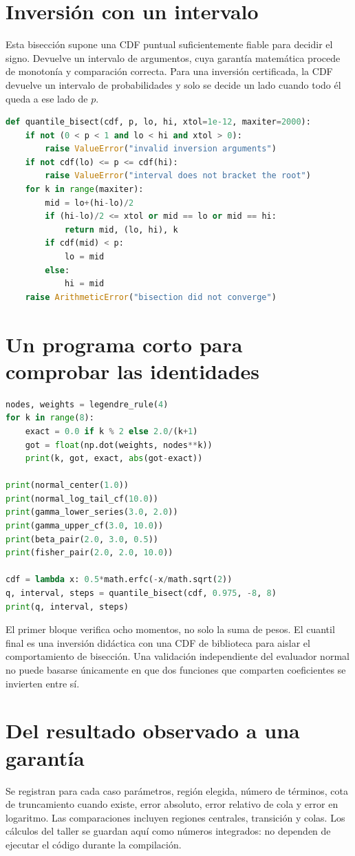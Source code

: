 \documentclass[11pt,a4paper]{article}
\theoremstyle{definition}
\begin{document}
\section{Inversión con un intervalo}
Esta bisección supone una CDF puntual suficientemente fiable para decidir el signo. Devuelve un intervalo de argumentos, cuya garantía matemática procede de monotonía y comparación correcta. Para una inversión certificada, la CDF devuelve un intervalo de probabilidades y solo se decide un lado cuando todo él queda a ese lado de $p$.
\begin{lstlisting}[language=Python]
def quantile_bisect(cdf, p, lo, hi, xtol=1e-12, maxiter=2000):
    if not (0 < p < 1 and lo < hi and xtol > 0):
        raise ValueError("invalid inversion arguments")
    if not cdf(lo) <= p <= cdf(hi):
        raise ValueError("interval does not bracket the root")
    for k in range(maxiter):
        mid = lo+(hi-lo)/2
        if (hi-lo)/2 <= xtol or mid == lo or mid == hi:
            return mid, (lo, hi), k
        if cdf(mid) < p:
            lo = mid
        else:
            hi = mid
    raise ArithmeticError("bisection did not converge")
\end{lstlisting}
\section{Un programa corto para comprobar las identidades}
\begin{lstlisting}[language=Python]
nodes, weights = legendre_rule(4)
for k in range(8):
    exact = 0.0 if k % 2 else 2.0/(k+1)
    got = float(np.dot(weights, nodes**k))
    print(k, got, exact, abs(got-exact))

print(normal_center(1.0))
print(normal_log_tail_cf(10.0))
print(gamma_lower_series(3.0, 2.0))
print(gamma_upper_cf(3.0, 10.0))
print(beta_pair(2.0, 3.0, 0.5))
print(fisher_pair(2.0, 2.0, 10.0))

cdf = lambda x: 0.5*math.erfc(-x/math.sqrt(2))
q, interval, steps = quantile_bisect(cdf, 0.975, -8, 8)
print(q, interval, steps)
\end{lstlisting}
El primer bloque verifica ocho momentos, no solo la suma de pesos. El cuantil final es una inversión didáctica con una CDF de biblioteca para aislar el comportamiento de bisección. Una validación independiente del evaluador normal no puede basarse únicamente en que dos funciones que comparten coeficientes se invierten entre sí.

\section{Del resultado observado a una garantía}
Se registran para cada caso parámetros, región elegida, número de términos, cota de truncamiento cuando existe, error absoluto, error relativo de cola y error en logaritmo. Las comparaciones incluyen regiones centrales, transición y colas. Los cálculos del taller se guardan aquí como números integrados: no dependen de ejecutar el código durante la compilación.
\end{document}

